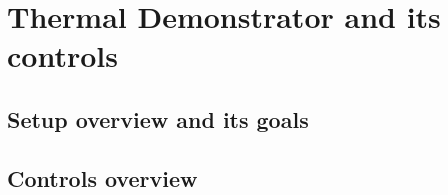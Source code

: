 \section{Thermal Demonstrator and its controls}
\subsection{Setup overview and its goals}
\subsection{Controls overview}